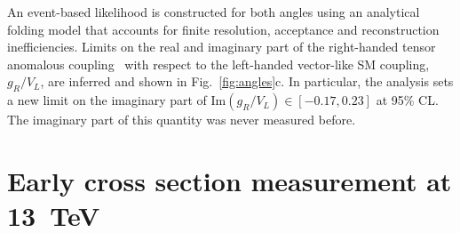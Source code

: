 \documentclass{PoS}
\begin{document}
An event-based likelihood is constructed for both angles using an analytical folding model that accounts for finite resolution, acceptance and reconstruction inefficiencies. Limits on the real and imaginary part of the right-handed tensor anomalous coupling~\cite{minimal-anom-set} with respect to the left-handed vector-like SM coupling, $g_{R}/V_{L}$, are inferred and shown in Fig.~\ref{fig:angles}c. In particular, the analysis sets a new limit on the imaginary part of $\mathrm{Im}(g_{R}/V_{L})\in[-0.17,0.23]$ at 95\% CL. The imaginary part of this quantity was never measured before.


\section{Early cross section measurement at 13~TeV}
\end{document}
